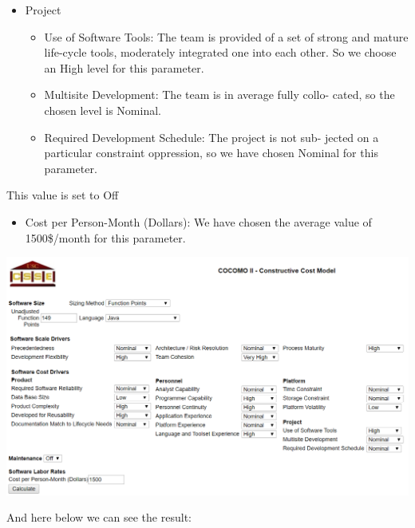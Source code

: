 \begin{itemize}
\begin{itemize}
\begin{itemize}
        \end{itemize}
      \item Project
        \begin{itemize}
          \item Use of Software Tools: The team is provided of a set of strong and mature life-cycle tools, moderately integrated one into each other.  So we choose an High level for this  parameter.
          \item Multisite Development: The team is in average fully collo- cated, so the chosen level is Nominal.
          \item Required Development Schedule: The project is not sub- jected on a particular constraint oppression, so we have chosen Nominal for this parameter.
        \end{itemize}
      \end{itemize}
     This value is set to Off
      \begin{itemize}
        \item Cost per Person-Month (Dollars): We have chosen the average value of 1500\$/month for this parameter.
      \end{itemize}
    \end{itemize}


  \begin{center}
  	\includegraphics[width=\textwidth]{Resources/Cocomo_2.PNG}
  	\label{COCOMO tools}
  \end{center}
  \newpage{}
  And here below we can see the result:

